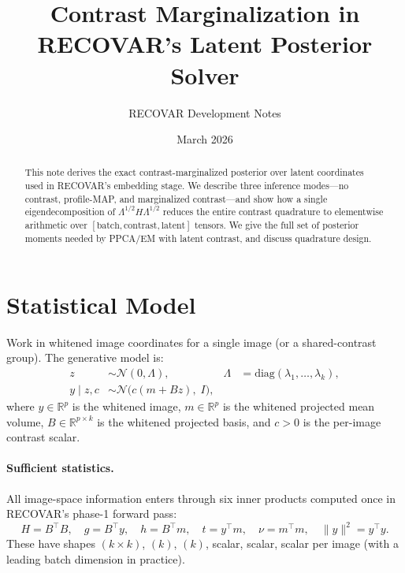 \documentclass[11pt]{article}
\title{Contrast Marginalization in RECOVAR's Latent Posterior Solver}
\author{RECOVAR Development Notes}
\date{March 2026}
\newcommand{\R}{\mathbb{R}}
\newcommand{\diag}{\mathrm{diag}}
\begin{document}
\maketitle

\begin{abstract}
This note derives the exact contrast-marginalized posterior over latent
coordinates used in RECOVAR's embedding stage.  We describe three inference
modes---no contrast, profile-MAP, and marginalized contrast---and show how a
single eigendecomposition of $\Lambda^{1/2} H \Lambda^{1/2}$ reduces the
entire contrast quadrature to elementwise arithmetic over
$[\text{batch}, \text{contrast}, \text{latent}]$ tensors.  We give the full
set of posterior moments needed by PPCA/EM with latent contrast, and discuss
quadrature design.
\end{abstract}

\tableofcontents

\section{Statistical Model}
\label{sec:model}

Work in whitened image coordinates for a single image (or a shared-contrast
group).  The generative model is:
\begin{align}
  z &\sim \mathcal{N}(0, \Lambda), &
  \Lambda &= \diag(\lambda_1, \dots, \lambda_k), \label{eq:prior} \\
  y \mid z, c &\sim \mathcal{N}\bigl(c(m + Bz),\; I\bigr), \label{eq:likelihood}
\end{align}
where $y \in \R^p$ is the whitened image, $m \in \R^p$ is the whitened
projected mean volume, $B \in \R^{p \times k}$ is the whitened projected
basis, and $c > 0$ is the per-image contrast scalar.

\paragraph{Sufficient statistics.}
All image-space information enters through six inner products computed once
in RECOVAR's phase-1 forward pass:
\begin{equation}
  \label{eq:stats}
  H = B^\top B, \quad
  g = B^\top y, \quad
  h = B^\top m, \quad
  t = y^\top m, \quad
  \nu = m^\top m, \quad
  \|y\|^2 = y^\top y.
\end{equation}
These have shapes
$(k \times k)$, $(k)$, $(k)$, scalar, scalar, scalar
per image (with a leading batch dimension in practice).
\end{document}
